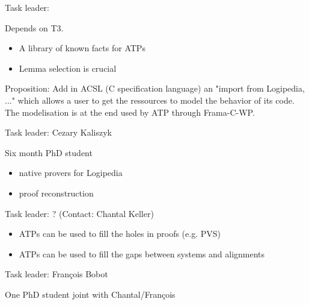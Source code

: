 \begin{workpackage}[id=atpetc,wphases=0-48,type=RTD,
  short=ATPs etc.,%
  title={ATP, SAT, SMT, Model checkers},
  lead=Lie,
  LieRM=10]
\begin{tasklist}
\begin{task}[id=deduktitoatp, title=Translate Dedukti statements into ATPs inputs]
\end{task}


\begin{task}[id=library, title=Logipedia as a source of knowledge for ATP]
  Task leader: %

Depends on T3.

\begin{itemize}
\item A library of known facts for ATPs
\item Lemma selection is crucial
\end{itemize}

Proposition: Add in ACSL (C specification language) an "import from
Logipedia, ..." which allows a user to get the ressources to model the
behavior of its code. The modelisation is at the end used by ATP through
Frama-C-WP.

\end{task}


\begin{task}[id=reconstruction, title=ATPs for Logipedia]
  Task leader: Cezary Kaliszyk

  Six month PhD student

\begin{itemize}
\item native provers for Logipedia
\item proof reconstruction
\end{itemize}

\end{task}


\begin{task}[id=readiness, title=Using ATPs to increase Logipedia readiness]
  Task leader: ?
  (Contact: Chantal Keller)

\begin{itemize}
\item ATPs can be used to fill the holes in proofs (e.g. PVS)
\item ATPs can be used to fill the gaps between systems and alignments
\end{itemize}

\end{task}


\begin{task}[id=cooperation, title=Make ATPs cooperate]
  Task leader: François Bobot

  One PhD student joint with Chantal/François


\end{task}
\end{tasklist}
\end{workpackage}
